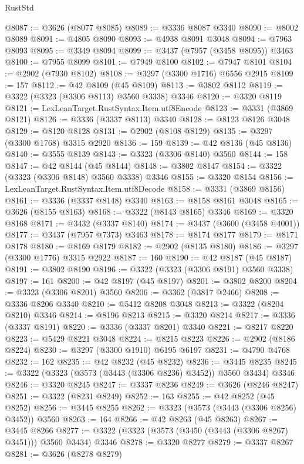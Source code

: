 \begin{lexlean}{RustStd}
\begin{coremodule}
@8087 := @3626 (@8077 @8085)
@8089 := @3336 @8087 @3340
@8090 := @8002 @8089
@8091 := @4805 @8090
@8093 := @4938 @8091 @3048
@8094 := @7963 @8093
@8095 := @3349 @8094
@8099 := @3437 (@7957 (@3458 @8095)) @3463
@8100 := @7955 @8099
@8101 := @7949 @8100
@8102 := @7947 @8101
@8104 := @2902 (@7930 @8102)
@8108 := @3297 (@3300 @1716) @6556 @2915
@8109 := 157
@8112 := @42 @8109 (@45 @8109)
@8113 := @3802 @8112
@8119 := @3322 (@3323 (@3306 @8113) @3560 @3338) @3346
@8120 := @3320 @8119
@8121 := LexLeanTarget.RustSyntax.Item.utf8Encode
@8123 := @3331 (@3869 @8121)
@8126 := @3336 (@3337 @8113) @3340
@8128 := @8123 @8126 @3048
@8129 := @8120 @8128
@8131 := @2902 (@8108 @8129)
@8135 := @3297 (@3300 @1768) @3315 @2920
@8136 := 159
@8139 := @42 @8136 (@45 @8136)
@8140 := @3555 @8139
@8143 := @3323 (@3306 @8140) @3560
@8144 := 158
@8147 := @42 @8144 (@45 @8144)
@8148 := @3802 @8147
@8154 := @3322 (@3323 (@3306 @8148) @3560 @3338) @3346
@8155 := @3320 @8154
@8156 := LexLeanTarget.RustSyntax.Item.utf8Decode
@8158 := @3331 (@3869 @8156)
@8161 := @3336 (@3337 @8148) @3340
@8163 := @8158 @8161 @3048
@8165 := @3626 (@8155 @8163)
@8168 := @3322 (@8143 @8165) @3346
@8169 := @3320 @8168
@8171 := @3432 (@3337 @8140)
@8174 := @3437 (@3600 (@3458 @4001))
@8177 := @3437 (@7957 @7373) @3463
@8178 := @8174 @8177
@8179 := @8171 @8178
@8180 := @8169 @8179
@8182 := @2902 (@8135 @8180)
@8186 := @3297 (@3300 @1776) @3315 @2922
@8187 := 160
@8190 := @42 @8187 (@45 @8187)
@8191 := @3802 @8190
@8196 := @3322 (@3323 (@3306 @8191) @3560 @3338)
@8197 := 161
@8200 := @42 @8197 (@45 @8197)
@8201 := @3802 @8200
@8204 := @3323 (@3306 @8201) @3560
@8206 := @3362 (@3817 @2466)
@8208 := @3336 @8206 @3340
@8210 := @5412 @8208 @3048
@8213 := @3322 (@8204 @8210) @3346
@8214 := @8196 @8213
@8215 := @3320 @8214
@8217 := @3336 (@3337 @8191)
@8220 := @3336 (@3337 @8201) @3340
@8221 := @8217 @8220
@8223 := @5429 @8221 @3048
@8224 := @8215 @8223
@8226 := @2902 (@8186 @8224)
@8230 := @3297 (@3300 @1910) @6195 @6197
@8231 := @4790 @4768
@8232 := 162
@8235 := @42 @8232 (@45 @8232)
@8236 := @3445 @8235
@8245 := @3322 (@3323 (@3573 (@3443 (@3306 @8236) @3452)) @3560 @3434) @3346
@8246 := @3320 @8245
@8247 := @3337 @8236
@8249 := @3626 (@8246 @8247)
@8251 := @3322 (@8231 @8249)
@8252 := 163
@8255 := @42 @8252 (@45 @8252)
@8256 := @3445 @8255
@8262 := @3323 (@3573 (@3443 (@3306 @8256) @3452)) @3560
@8263 := 164
@8266 := @42 @8263 (@45 @8263)
@8267 := @3445 @8266
@8277 := @3322 (@3323 (@3573 (@3450 (@3443 (@3306 @8267) @3451))) @3560 @3434) @3346
@8278 := @3320 @8277
@8279 := @3337 @8267
@8281 := @3626 (@8278 @8279)

\end{coremodule}
\end{lexlean}

